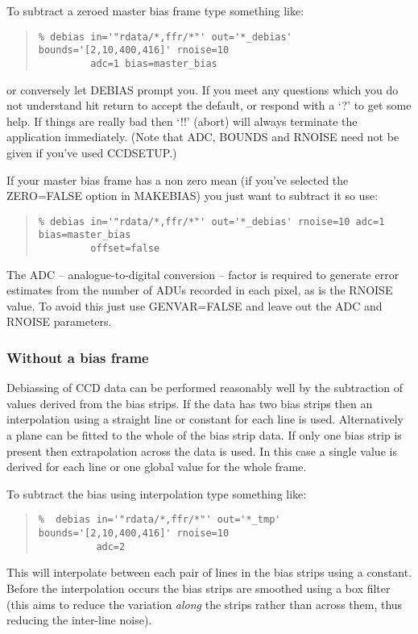 \documentclass[twoside,11pt]{article}
\newcommand{\htmlref}[2]{#1}
\newcommand{\xlabel}[1]{}
\renewcommand{\_}{\texttt{\symbol{95}}}
\newenvironment{myquote}{\begin{quote}\begin{small}}{\end{small}\end{quote}}
\newcommand{\routine}[1]{{\sc #1}}
\newcommand{\xroutine}[1]{\htmlref{{\sc #1}}{#1}}
\begin{document}
To subtract a zeroed master bias frame type something like:
\begin{myquote}
\begin{verbatim}
% debias in='"rdata/*,ffr/*"' out='*_debias' bounds='[2,10,400,416]' rnoise=10
         adc=1 bias=master_bias
\end{verbatim}
\end{myquote}
or conversely let \routine{DEBIAS} prompt you. If you meet any questions which you
do not understand hit return to accept the default, or respond with a
`?' to get some help. If things are really bad then `!!' (abort) will
always terminate the application immediately. (Note that ADC,
BOUNDS and RNOISE need not be given if you've used
\xroutine{CCDSETUP}.)

If your master bias frame has a non zero mean (if you've selected
the ZERO=FALSE option in \routine{MAKEBIAS}) you just want to subtract
it so use:
\begin{myquote}
\begin{verbatim}
% debias in='"rdata/*,ffr/*"' out='*_debias' rnoise=10 adc=1 bias=master_bias
         offset=false
\end{verbatim}
\end{myquote}
The ADC  -- analogue-to-digital conversion --  factor is
required to generate error estimates from the number of ADUs recorded in
each pixel, as is the RNOISE value.
To avoid this just use GENVAR=FALSE and leave out the
ADC and RNOISE parameters.

\subsubsection{\xlabel{nobiasframes}Without a bias frame}

Debiassing of CCD data can be performed reasonably well by the
subtraction of values derived from the bias strips.
If the data has two bias strips then an interpolation using a straight
line or constant for each line is used.
Alternatively a plane can be fitted to the whole of the bias strip data.
If only one bias strip is present then extrapolation across the data
is used. In this case a single value is derived for each line or
one global value for the whole frame.

To subtract the bias using interpolation type something like:
\begin{myquote}
\begin{verbatim}
%  debias in='"rdata/*,ffr/*"' out='*_tmp' bounds='[2,10,400,416]' rnoise=10
          adc=2
\end{verbatim}
\end{myquote}
This will interpolate between each pair of lines in the bias strips
using a  constant. Before the interpolation occurs the bias strips are
smoothed using a box filter (this aims to reduce the variation {\em along}
the strips rather than across them, thus reducing the inter-line noise).
\end{document}
